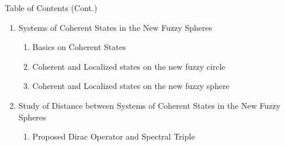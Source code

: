 \begin{frame}{Table of Contents (Cont.)}
    \begin{enumerate}
    \tiny
    
    \item Systems of Coherent States in the New Fuzzy Spheres
        
        \begin{enumerate} \tiny
        
        \item Basics on Coherent States
           
        \item Coherent and Localized states on the new fuzzy circle
        
        \item Coherent and Localized states on the new fuzzy sphere 
            
        \end{enumerate}
    \item Study of Distance between Systems of Coherent States in the New Fuzzy Spheres
    
        \begin{enumerate} \tiny
            
        \item Proposed Dirac Operator and Spectral Triple
            
        \end{enumerate}
        
    \end{enumerate}
      
\end{frame}